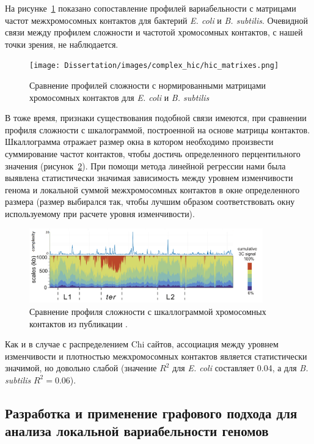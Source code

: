 На рисунке~\ref{img:hic_matrixes} показано сопоставление профилей вариабельности с матрицами частот межхромосомных контактов для бактерий \textit{E. coli} и \textit{B. subtilis}. Очевидной связи между профилем сложности и частотой хромосомных контактов, с нашей точки зрения, не наблюдается.

\begin{figure}[!ht] 
  \center
    \texttt{[image: Dissertation/images/complex\_hic/hic\_matrixes.png]}
    \caption{Сравнение профилей сложности с нормированными матрицами хромосомных контактов для \textit{E. coli} и \textit{B. subtilis}}
    \label{img:hic_matrixes}
\end{figure}

В тоже время, признаки существования подобной связи имеются, при сравнении профиля сложности с шкалограммой, построенной на основе матрицы контактов. Шкаллограмма отражает размер окна в котором необходимо произвести суммирование частот контактов, чтобы достичь определенного перцентильного значения (рисунок~\ref{img:scalogram_complexity_coli}). При помощи метода линейной регрессии нами была выявлена статистически значимая зависимость между уровнем изменчивости генома и локальной суммой межхромосомных контактов в окне определенного размера (размер выбирался так, чтобы лучшим образом соответствовать окну используемому при расчете уровня изменчивости). 
 
\begin{figure}[!ht] 
  \center
    \includegraphics [width=0.9\textwidth] {Dissertation/images/complex_hic/hic_scalogram_complexity_coli.png}
    \caption{Сравнение профиля сложности с шкаллограммой хромосомных контактов из публикации \cite{lioy2018multiscale}.}
    \label{img:scalogram_complexity_coli}
\end{figure}

Как и в случае с распределением Chi сайтов, ассоциация между уровнем изменчивости и плотностью межхромосомных контактов является статистически значимой, но довольно слабой (значение $R^2$ для \textit{E. coli} составляет 0.04, а для \textit{B. subtilis} $R^2 = 0.06$).

\subsection*{Разработка и применение графового подхода для анализа локальной вариабельности геномов}

